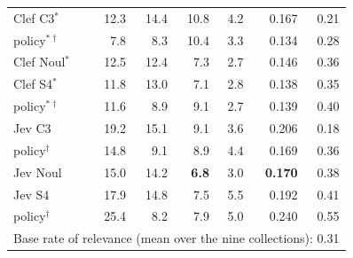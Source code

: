 \begin{table}[t]
\begin{tabular}{lrrrrrr}
Clef C3$^\ast$ & 12.3 & 14.4 & 10.8 & 4.2 & 0.167 & 0.21 \\
\quad policy$^{\ast\dagger}$ & 7.8 & 8.3 & 10.4 & 3.3 & 0.134 & 0.28 \\
Clef Noul$^\ast$ & 12.5 & 12.4 & 7.3 & 2.7 & 0.146 & 0.36 \\
Clef S4$^\ast$ & 11.8 & 13.0 & 7.1 & 2.8 & 0.138 & 0.35 \\
\quad policy$^{\ast\dagger}$ & 11.6 & 8.9 & 9.1 & 2.7 & 0.139 & 0.40 \\
Jev C3 & 19.2 & 15.1 & 9.1 & 3.6 & 0.206 & 0.18 \\
\quad policy$^\dagger$ & 14.8 & 9.1 & 8.9 & 4.4 & 0.169 & 0.36 \\
Jev Noul & 15.0 & 14.2 & \textbf{6.8} & 3.0 & \textbf{0.170} & 0.38 \\
Jev S4 & 17.9 & 14.8 & 7.5 & 5.5 & 0.192 & 0.41 \\
\quad policy$^\dagger$ & 25.4 & 8.2 & 7.9 & 5.0 & 0.240 & 0.55 \\
\midrule
\multicolumn{7}{l}{\footnotesize Base rate of relevance (mean over the nine collections): 0.31} \\
\bottomrule
\end{tabular}
\end{table}